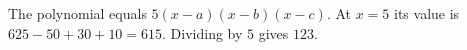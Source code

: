 The polynomial equals $5(x-a)(x-b)(x-c)$. At $x=5$ its value is $625-50+30+10=615$. Dividing by $5$ gives $\boxed{123}$.
